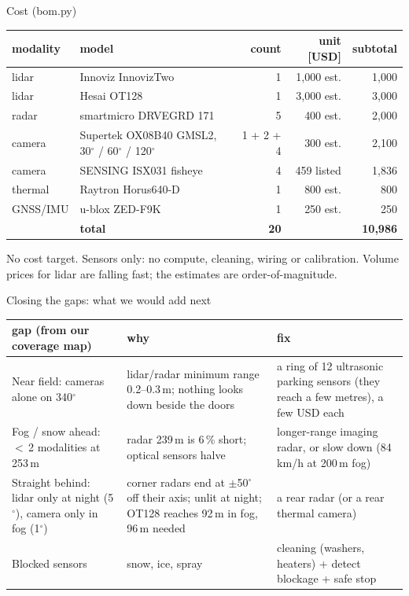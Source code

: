 \documentclass[aspectratio=169,11pt]{beamer}
\begin{document}
\begin{frame}{Cost (bom.py)}
  \centering\footnotesize
  \renewcommand{\arraystretch}{1.12}
  \begin{tabular}{@{}llrrr@{}}
    \toprule
    modality & model & count & unit [USD] & subtotal \\
    \midrule
    lidar & Innoviz InnovizTwo & 1 & 1,000 est. & 1,000 \\
    lidar & Hesai OT128 & 1 & 3,000 est. & 3,000 \\
    radar & smartmicro DRVEGRD 171 & 5 & 400 est. & 2,000 \\
    camera & Supertek OX08B40 GMSL2, 30$^\circ$ / 60$^\circ$ / 120$^\circ$ & 1 + 2 + 4 & 300 est. & 2,100 \\
    camera & SENSING ISX031 fisheye & 4 & 459 listed & 1,836 \\
    thermal & Raytron Horus640-D & 1 & 800 est. & 800 \\
    GNSS/IMU & u-blox ZED-F9K & 1 & 250 est. & 250 \\
    \midrule
    & \textbf{total} & \textbf{20} & & \textbf{10,986} \\
    \bottomrule
  \end{tabular}

  \vspace{0.6em}
  \raggedright
  No cost target. Sensors only: no compute, cleaning, wiring or calibration. Volume prices for lidar are falling fast;
  the estimates are order-of-magnitude.
\end{frame}

\begin{frame}{Closing the gaps: what we would add next}
  \footnotesize
  \renewcommand{\arraystretch}{1.2}
  \begin{tabular}{@{}L{3.4cm} L{5.8cm} L{4.6cm}@{}}
    \toprule
    gap (from our coverage map) & why & fix \\
    \midrule
    Near field: cameras alone on 340$^\circ$ & lidar/radar minimum range 0.2--0.3\,m; nothing looks down beside the doors &
      a ring of 12 ultrasonic parking sensors (they reach a few metres), a few USD each \\
    Fog / snow ahead: $<$\,2 modalities at 253\,m & radar 239\,m is 6\,\% short; optical sensors halve &
      longer-range imaging radar, or slow down (84\,km/h at 200\,m fog) \\
    Straight behind: lidar only at night (5$^\circ$), camera only in fog (1$^\circ$) & corner radars end at $\pm$50$^\circ$ off their
      axis; unlit at night; OT128 reaches 92\,m in fog, 96\,m needed & a rear radar (or a rear thermal camera) \\
    Blocked sensors & snow, ice, spray &
      cleaning (washers, heaters) + detect blockage + safe stop \\
    \bottomrule
  \end{tabular}
\end{frame}
\end{document}

